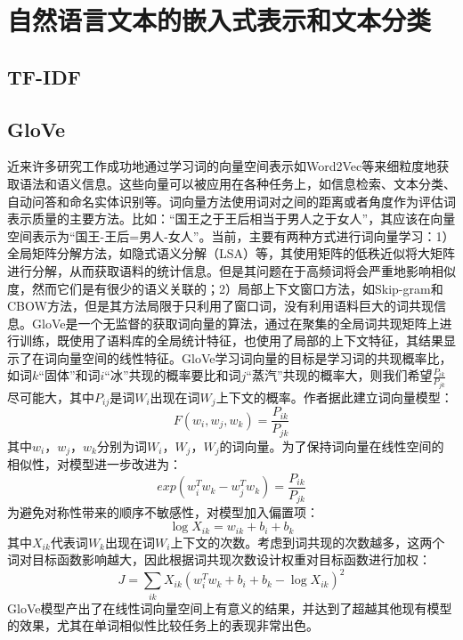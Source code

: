 \section{自然语言文本的嵌入式表示和文本分类}
\subsection{TF-IDF}
\subsection{GloVe}
近来许多研究工作成功地通过学习词的向量空间表示如Word2Vec\cite{mikolov2013distributed}等来细粒度地获取语法和语义信息。这些向量可以被应用在各种任务上，如信息检索、文本分类、自动问答和命名实体识别等。词向量方法使用词对之间的距离或者角度作为评估词表示质量的主要方法。比如：“国王之于王后相当于男人之于女人”，其应该在向量空间表示为“国王-王后=男人-女人”。当前，主要有两种方式进行词向量学习：1）全局矩阵分解方法，如隐式语义分解（LSA）\cite{deerwester1990indexing}等，其使用矩阵的低秩近似将大矩阵进行分解，从而获取语料的统计信息。但是其问题在于高频词将会严重地影响相似度，然而它们是有很少的语义关联的；2）局部上下文窗口方法，如Skip-gram和CBOW方法\cite{mikolov2013distributed}，但是其方法局限于只利用了窗口词，没有利用语料巨大的词共现信息。GloVe是一个无监督的获取词向量的算法，通过在聚集的全局词共现矩阵上进行训练，既使用了语料库的全局统计特征，也使用了局部的上下文特征，其结果显示了在词向量空间的线性特征。GloVe学习词向量的目标是学习词的共现概率比，如词$k$“固体”和词$i$“冰”共现的概率要比和词$j$“蒸汽”共现的概率大，则我们希望$\frac{P_{ik}}{P_{jk}}$尽可能大，其中$P_{ij}$是词$W_i$出现在词$W_j$上下文的概率。作者据此建立词向量模型：
$$F(w_i, w_j, w_k) = \frac{P_{ik}}{P_{jk}}$$
其中$w_i，w_j，w_k$分别为词$W_i，W_j，W_j$的词向量。为了保持词向量在线性空间的相似性，对模型进一步改进为：
$$exp(w_i^Tw_k-w_j^Tw_k)=\frac{P_{ik}}{P_{jk}}$$
为避免对称性带来的顺序不敏感性，对模型加入偏置项：
$$\log X_{ik}=w_{ik}+b_i+b_k$$
其中$X_{ik}$代表词$W_k$出现在词$W_i$上下文的次数。考虑到词共现的次数越多，这两个词对目标函数影响越大，因此根据词共现次数设计权重对目标函数进行加权：
$$J=\sum_{ik}X_{ik}(w_i^Tw_k+b_i+b_k-\log X_{ik})^2$$
GloVe模型产出了在线性词向量空间上有意义的结果，并达到了超越其他现有模型的效果，尤其在单词相似性比较任务上的表现非常出色。

